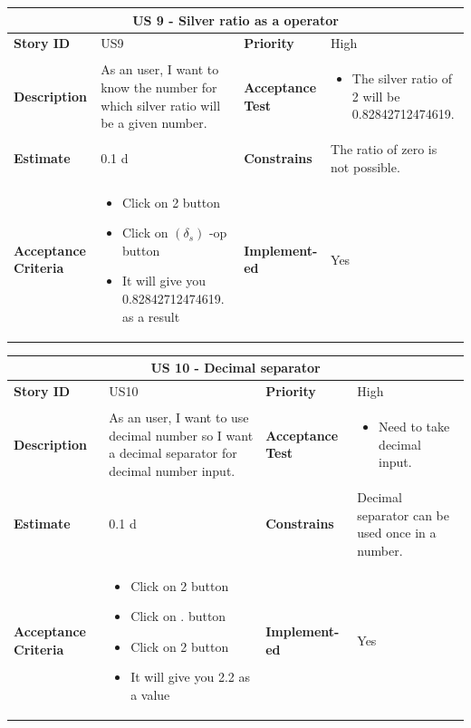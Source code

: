 \documentclass{article}
\begin{document}
\begin{tabular}{ |p{2cm}|p{5cm}|p{2cm}|p{4cm}| }
 \hline
 \multicolumn{4}{|c|}{US 9 - Silver ratio as a operator} \\
 \hline
 \textbf {Story ID}& US9 &  \textbf{Priority} & High \\
 \hline
  \textbf{Description}   & As an user, I want to know the number for which silver ratio will be a given number. &    \textbf{Acceptance Test}& 
\begin{itemize}
\item  The silver ratio of 2 will be 0.82842712474619.
\end{itemize}
  \\
 \hline
 \textbf{Estimate} & 0.1 d &  \textbf{Constrains}&  The ratio of zero is not possible.  \\
 \hline
 \textbf{Acceptance Criteria} & 
 \begin{itemize}
\item Click on 2 button
\item Click on $(\delta_s)$ -op button
\item It will give you 0.82842712474619. as a result 
\end{itemize}
 &  \textbf{Implement- ed}& Yes  \\
 \hline
\end{tabular}

\begin{tabular}{ |p{2cm}|p{5cm}|p{2cm}|p{4cm}| }
 \hline
 \multicolumn{4}{|c|}{US 10 -  Decimal separator} \\
 \hline
 \textbf {Story ID}& US10 &  \textbf{Priority} & High \\
 \hline
  \textbf{Description}   & As an user, I want to use decimal number so I want a decimal separator for decimal number input. &    \textbf{Acceptance Test}& 
\begin{itemize}
\item  Need to take decimal input.
\end{itemize}
  \\
 \hline
 \textbf{Estimate} & 0.1 d &  \textbf{Constrains}&  Decimal separator can be used once in a number.  \\
 \hline
 \textbf{Acceptance Criteria} & 
 \begin{itemize}
\item Click on 2 button
\item Click on .  button
\item Click on 2 button
\item It will give you 2.2 as a value 
\end{itemize}
 &  \textbf{Implement- ed}& Yes  \\
 \hline
\end{tabular}
\end{document}
